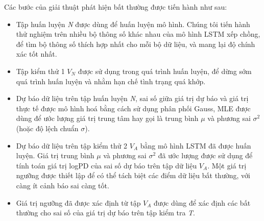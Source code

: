 Các bước của giải thuật phát hiện bất thường được tiến hành như sau:

\begin{itemize}
\item Tập huấn luyện \textit{N} được dùng để huấn luyện mô hình. Chúng tôi tiến hành thử nghiệm trên nhiều bộ thông số khác nhau của mô hình LSTM xếp chồng, để tìm bộ thông số thích hợp nhất cho mỗi bộ dữ liệu, và mang lại độ chính xác tốt nhất.
\item Tập kiểm thử 1 $V_{N}$ được sử dụng trong quá trình huấn luyện, để dừng sớm quá trình huấn luyện và nhằm hạn chế tình trạng quá khớp.
\item Dự báo dữ liệu trên tập huấn luyện \textit{N}, sai số giữa giá trị dự báo và giá trị thực tế được mô hình hoá bằng cách sử dụng phân phối Gauss, MLE được dùng để ước lượng giá trị trung tâm hay gọi là trung bình $\mu$ và phương sai $\sigma^{2}$ (hoặc độ lệch chuẩn $\sigma$).
\item Dự báo dữ liệu trên tập kiểm thử 2 $V_{A}$ bằng mô hình LSTM đã được huấn luyện. Giá trị trung bình $\mu$ và phương sai $\sigma^{2}$ đã ước lượng được sử dụng để tính toán giá trị logPD của sai số dự báo trên tập dữ liệu $V_{A}$. Một giá trị ngưỡng được thiết lập để có thể tách biệt các điểm dữ liệu bất thường, với càng ít cảnh báo sai càng tốt.
\item Giá trị ngưỡng đã được xác định từ tập $V_{A}$ được dùng để xác định các bất thường cho sai số của giá trị dự báo trên tập kiểm tra \textit{T}.
\end{itemize}